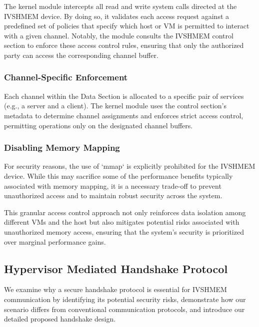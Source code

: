 \documentclass[conference]{IEEEtran}
\begin{document}
The kernel module intercepts all read and write system calls directed at the IVSHMEM device. By doing so, it validates each access request against a predefined set of policies that specify which host or VM is permitted to interact with a given channel. Notably, the module consults the IVSHMEM control section to enforce these access control rules, ensuring that only the authorized party can access the corresponding channel buffer.



\subsubsection{Channel-Specific Enforcement}

Each channel within the Data Section is allocated to a specific pair of services (e.g., a server and a client). The kernel module uses the control section's metadata to determine channel assignments and enforces strict access control, permitting operations only on the designated channel buffers.



\subsubsection{Disabling Memory Mapping}

For security reasons, the use of `mmap` is explicitly prohibited for the IVSHMEM device. While this may sacrifice some of the performance benefits typically associated with memory mapping, it is a necessary trade-off to prevent unauthorized access and to maintain robust security across the system.

This granular access control approach not only reinforces data isolation among different VMs and the host but also mitigates potential risks associated with unauthorized memory access, ensuring that the system's security is prioritized over marginal performance gains.



\subsection{Hypervisor Mediated Handshake Protocol}

We examine why a secure handshake protocol is essential for IVSHMEM communication by identifying its potential security risks, demonstrate how our scenario differs from conventional communication protocols, and introduce our detailed proposed handshake design.
\end{document}
